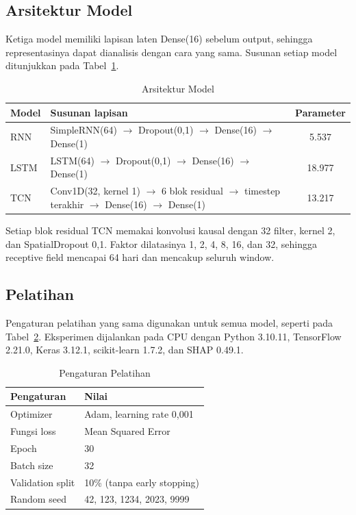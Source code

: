 \documentclass[conference,a4paper]{IEEEtran}
\begin{document}
\subsection{Arsitektur Model}
Ketiga model memiliki lapisan laten Dense(16) sebelum output, sehingga representasinya dapat dianalisis dengan cara yang sama. Susunan setiap model ditunjukkan pada Tabel~\ref{tab:arsitektur}.

\begin{table}[!t]
\centering
\caption{Arsitektur Model}
\label{tab:arsitektur}
\footnotesize
\begin{tabular}{@{}l>{\raggedright\arraybackslash}p{}c@{}}
\toprule
\textbf{Model} & \textbf{Susunan lapisan} & \textbf{Parameter} \\
\midrule
RNN & SimpleRNN(64) $\rightarrow$ Dropout(0,1) $\rightarrow$ Dense(16) $\rightarrow$ Dense(1) & 5.537 \\
LSTM & LSTM(64) $\rightarrow$ Dropout(0,1) $\rightarrow$ Dense(16) $\rightarrow$ Dense(1) & 18.977 \\
TCN & Conv1D(32, kernel 1) $\rightarrow$ 6 blok residual $\rightarrow$ timestep terakhir $\rightarrow$ Dense(16) $\rightarrow$ Dense(1) & 13.217 \\
\bottomrule
\end{tabular}
\end{table}

Setiap blok residual TCN memakai konvolusi kausal dengan 32 filter, kernel 2, dan SpatialDropout 0,1. Faktor dilatasinya 1, 2, 4, 8, 16, dan 32, sehingga receptive field mencapai 64 hari dan mencakup seluruh window.

\subsection{Pelatihan}
Pengaturan pelatihan yang sama digunakan untuk semua model, seperti pada Tabel~\ref{tab:pelatihan}. Eksperimen dijalankan pada CPU dengan Python 3.10.11, TensorFlow 2.21.0, Keras 3.12.1, scikit-learn 1.7.2, dan SHAP 0.49.1.

\begin{table}[!t]
\centering
\caption{Pengaturan Pelatihan}
\label{tab:pelatihan}
\footnotesize
\begin{tabular}{@{}ll@{}}
\toprule
\textbf{Pengaturan} & \textbf{Nilai} \\
\midrule
Optimizer & Adam, learning rate 0,001 \\
Fungsi loss & Mean Squared Error \\
Epoch & 30 \\
Batch size & 32 \\
Validation split & 10\% (tanpa early stopping) \\
Random seed & 42, 123, 1234, 2023, 9999 \\
\bottomrule
\end{tabular}
\end{table}
\end{document}
